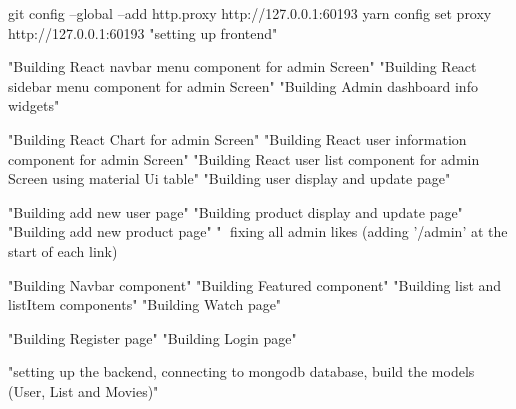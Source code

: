 git config --global --add http.proxy http://127.0.0.1:60193
yarn config set proxy http://127.0.0.1:60193
"setting up frontend"

"Building React navbar menu component for admin Screen"
"Building React sidebar menu component for admin Screen"
"Building Admin dashboard info widgets"

"Building React Chart for admin Screen"
"Building React user information component for admin Screen"
"Building React user list component for admin Screen using material Ui table"
"Building user display and update page"

"Building add new user page"
"Building product display and update page"
"Building add new product page"
"🔨 fixing all admin likes (adding '/admin' at the start of each link)

"Building Navbar component"
"Building Featured component"
"Building list and listItem components"
"Building Watch page"

"Building Register page"
"Building Login page"

"setting up the backend, connecting to mongodb database, build the models (User, List and Movies)"